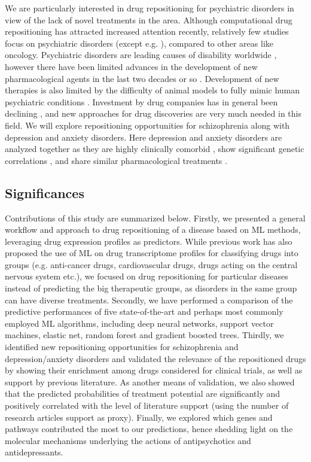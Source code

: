     We are particularly interested in drug repositioning for psychiatric disorders in view of the lack of novel treatments in the area. Although computational drug repositioning has attracted increased attention recently, relatively few studies focus on psychiatric disorders (except e.g. \cite{xu2015phenopredict,de2016gene,powell2017transcriptomic,so2017analysis}), compared to other areas like oncology. Psychiatric disorders are leading causes of disability worldwide \cite{vigo2016estimating}, however there have been limited advances in the development of new pharmacological agents in the last two decades or so \cite{hyman2013psychiatric}. Development of new therapies is also limited by the difficulty of animal models to fully mimic human psychiatric conditions \cite{nestler2010animal}. Investment by drug companies has in general been declining \cite{hyman2013psychiatric}, and new approaches for drug discoveries are very much needed in this field. We will explore repositioning opportunities for schizophrenia along with depression and anxiety disorders. Here depression and anxiety disorders are analyzed together as they are highly clinically comorbid \cite{lamb2006connectivity,kessler2015anxious}, show significant genetic correlations \cite{otowa2016meta}, and share similar pharmacological treatments \cite{ballenger2000anxiety}. 
    
  \subsection{Significances}
    Contributions of this study are summarized below. Firstly, we presented a general workflow and approach to drug repositioning of a disease based on ML methods, leveraging drug expression profiles as predictors. While previous work \cite{aliper2016deep} has also proposed the use of ML on drug transcriptome profiles for classifying drugs into groups (e.g. anti-cancer drugs, cardiovascular drugs, drugs acting on the central nervous system etc.), we focused on drug repositioning for particular diseases instead of predicting the big therapeutic groups, as disorders in the same group can have diverse treatments. Secondly, we have performed a comparison of the predictive performances of five state-of-the-art and perhaps most commonly employed ML algorithms, including deep neural networks, support vector machines, elastic net, random forest and gradient boosted trees. Thirdly, we identified new repositioning opportunities for schizophrenia and depression/anxiety disorders and validated the relevance of the repositioned drugs by showing their enrichment among drugs considered for clinical trials, as well as support by previous literature. As another means of validation, we also showed that the predicted probabilities of treatment potential are significantly and positively correlated with the level of literature support (using the number of research articles support as proxy). Finally, we explored which genes and pathways contributed the most to our predictions, hence shedding light on the molecular mechanisms underlying the actions of antipsychotics and antidepressants. 

